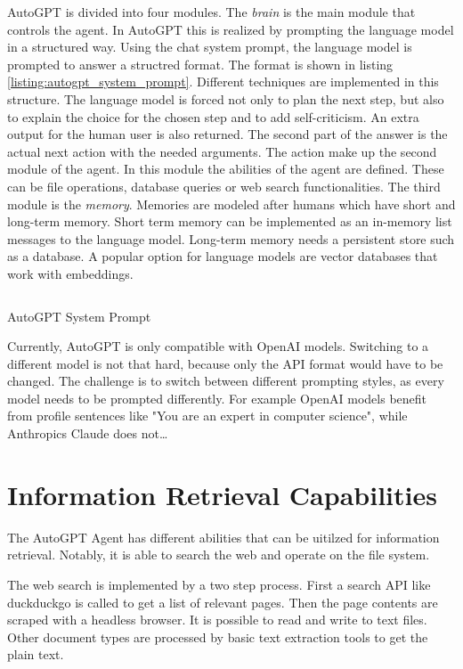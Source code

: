 \documentclass[english, version-2022-01]{uzl-thesis}
\begin{document}
AutoGPT is divided into four modules. The \textit{brain} is the main module that controls the agent. In AutoGPT this is realized by prompting the language model in a structured way. Using the chat system prompt, the language model is prompted to answer a structred format. The format is shown in listing \ref{listing:autogpt_system_prompt}. Different techniques are implemented in this structure. The language model is forced not only to plan the next step, but also to explain the choice for the chosen step and to add self-criticism. An extra output for the human user is also returned. The second part of the answer is the actual next action with the needed arguments. The action make up the second module of the agent. In this module the abilities of the agent are defined. These can be file operations, database queries or web search functionalities. The third module is the \textit{memory}. Memories are modeled after humans which have short and long-term memory. Short term memory can be implemented as an in-memory list messages to the language model. Long-term memory needs a persistent store such as a database. A popular option for language models are vector databases that work with embeddings.

\begin{listing}
	\inputminted{jinja}{include/code/system-format.j2}
	\caption{AutoGPT System Prompt}
	\label{listing:autogpt_system_prompt}
\end{listing}

Currently, AutoGPT is only compatible with OpenAI models. Switching to a different model is not that hard, because only the API format would have to be changed. The challenge is to switch between different prompting styles, as every model needs to be prompted differently. For example OpenAI models benefit from profile sentences like "You are an expert in computer science", while Anthropics Claude does not\dots

\section{Information Retrieval Capabilities}

The AutoGPT Agent has different abilities that can be uitilzed for information retrieval. Notably, it is able to search the web and operate on the file system.

The web search is implemented by a two step process. First a search API like duckduckgo is called to get a list of relevant pages. Then the page contents are scraped with a headless browser. It is possible to read and write to text files. Other document types are processed by basic text extraction tools to get the plain text.
\end{document}
